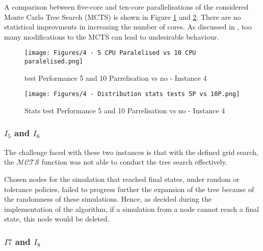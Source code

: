 A comparison between five-core and ten-core parallelisations of the considered Monte Carlo Tree Search (MCTS) is shown in Figure \ref{fig:parralel (5 vs 10)} and \ref{fig:Stats test 5 VS 10 Parall}. There are no statistical improvments in increasing the number of cores. As discussed in \cite{different_selection_policies}, too many modifications to the MCTS can lead to undesirable behaviour.

\begin{figure}[!ht]
    \centering
    \texttt{[image: Figures/4 - 5 CPU Paralelised vs 10 CPU paralelised.png]}
    \caption{test Performance 5 and 10 Parrelisation vs no - Instance 4}
    \label{fig:parralel (5 vs 10)}
\end{figure}


\begin{figure}[!ht]
    \centering
    \texttt{[image: Figures/4 - Distribution stats tests 5P vs 10P.png]}
    \caption{Stats test Performance 5 and 10 Parrelisation vs no - Instance 4}
    \label{fig:Stats test 5 VS 10 Parall}
\end{figure}

\newpage
\subsubsection{$I_5$ and $I_6$}

The challenge faced with these two instances is that with the defined grid search, the $\mathcal{MCTS}$ function was not able to conduct the tree search effectively.

Chosen nodes for the simulation that reached final states, under random or tolerance policies, failed to progress further the expansion of the tree because of the randomness of these simulations. Hence, as decided during the implementation of the algorithm, if a simulation from a node cannot reach a final state, this node would be deleted.
\subsubsection{$I7$ and $I_8$}

